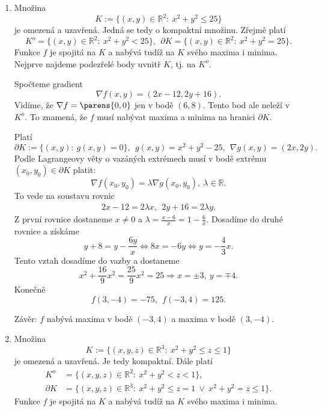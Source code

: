\documentclass[answers]{exam}
\begin{document}
\begin{questions}
	\begin{solution}
		\begin{enumerate}[label=(\roman*)]
			\item 
				Mno\v zina
				$$K:=\{(x,y)\in\mathbb R^2:\ x^2+y^2\le25\}$$
				je omezen\'a a uzav\v ren\'a. Jedn\'a se tedy o kompaktn\'i mno\v zinu. Z\v rejm\v e plat\'i
				$$K^o=\{(x,y)\in\mathbb R^2:\ x^2+y^2<25\},\ \ \partial K=\{(x,y)\in\mathbb R^2:\ x^2+y^2=25\}.$$
				Funkce $f$ je spojit\'a na $K$ a nab\'yv\'a tud\'i\v z na $K$ sv\'eho maxima i minima. Nejprve najdeme podez\v rel\'e body uvnit\v r $K$, tj. na $K^o$.
				
				Spo\v cteme gradient
				$$\nabla f(x,y)=(2x-12,2y+16).$$
				Vid\'ime, \v ze $\nabla f=\parens{0,0}$ jen v bod\v e $(6,8)$. Tento bod ale nele\v z\'i v $K^o$. To znamen\'a, \v ze $f$ mus\'i nab\'yvat maxima a minima na hranici $\partial K$. 
				
				Plat\'i
				$$\partial K:=\{(x,y):\ g(x,y)=0\},\ \ g(x,y)=x^2+y^2-25,\ \ \nabla g(x,y)=(2x,2y).$$
				Podle Lagrangeovy v\v ety o vaz\'an\'ych extr\'emech mus\'i v bod\v e extr\'emu $(x_0,y_0)\in\partial K$ platit:
				$$\nabla f (x_0,y_0)=\lambda\nabla g(x_0,y_0),\ \lambda\in\mathbb R.$$
				To vede na soustavu rovnic
				\begin{align*}
				2x-12=2\lambda x,\ \ 2y+16=2\lambda y. 
				\end{align*}
				Z prvn\'i rovnice dostaneme $x\ne0$ a $\lambda=\frac{x-6}{x}=1-\frac{6}{x}$. Dosad\'ime do druh\'e rovnice  a z\'isk\'ame 
				$$y+8=y-\frac{6y}{x}\Leftrightarrow 8x=-6y\Leftrightarrow y=-\frac{4}{3}x.$$
				Tento vztah dosad\'ime do vazby a dostaneme 
				$$x^2+\frac{16}{9}x^2=\frac{25}{9}x^2=25\Rightarrow x=\pm 3,\ y=\mp 4.$$
				Kone\v cn\v e 
				$$f(3,-4)=-75,\ \ f(-3,4)=125.$$
				
				Z\'av\v er: $f$ nab\'yv\'a maxima v bod\v e $(-3,4)$ a maxima v bod\v e $(3,-4)$.
				
			\item
				
				Mno\v zina
				$$K:=\{(x,y,z)\in\mathbb R^3:\ x^2+y^2\le z\le 1\}$$
				je omezen\'a a uzav\v ren\'a. Je tedy kompaktn\'i. D\'ale plat\'i
				\begin{align*}
				K^o&=\{(x,y,z)\in\mathbb R^2:\ x^2+y^2<z<1\},\\
				\partial K&=\{(x,y,z)\in\mathbb R^3:\ x^2+y^2\le z=1\ \vee \ x^2+y^2=z\le 1\}.
				\end{align*}
				Funkce $f$ je spojit\'a na $K$ a nab\'yv\'a tud\'i\v z na $K$ sv\'eho maxima i minima. 
				

\end{enumerate}
\end{solution}
\end{questions}
\end{document}
